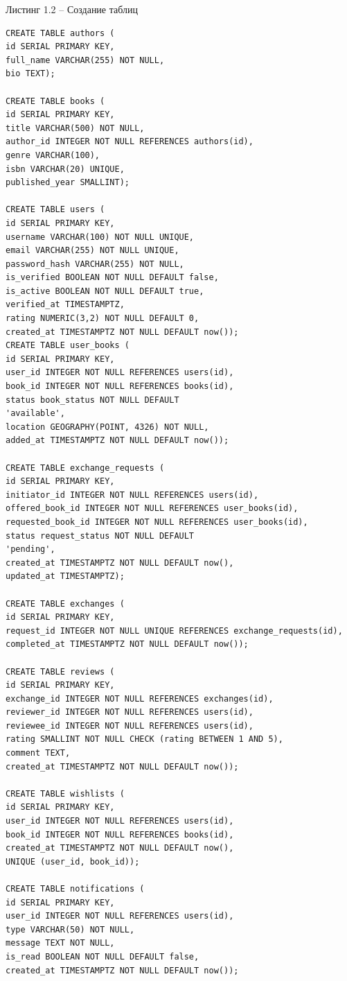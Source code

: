 \documentclass[14pt,a4paper]{extarticle}
\begin{document}
\begin{center}
Листинг 1.2 -- Создание таблиц
\end{center}
\begin{lstlisting}
CREATE TABLE authors (
id SERIAL PRIMARY KEY,
full_name VARCHAR(255) NOT NULL,
bio TEXT);

CREATE TABLE books (
id SERIAL PRIMARY KEY,
title VARCHAR(500) NOT NULL,
author_id INTEGER NOT NULL REFERENCES authors(id),
genre VARCHAR(100),
isbn VARCHAR(20) UNIQUE,
published_year SMALLINT);

CREATE TABLE users (
id SERIAL PRIMARY KEY,
username VARCHAR(100) NOT NULL UNIQUE,
email VARCHAR(255) NOT NULL UNIQUE,
password_hash VARCHAR(255) NOT NULL,
is_verified BOOLEAN NOT NULL DEFAULT false,
is_active BOOLEAN NOT NULL DEFAULT true,
verified_at TIMESTAMPTZ,
rating NUMERIC(3,2) NOT NULL DEFAULT 0,
created_at TIMESTAMPTZ NOT NULL DEFAULT now());
CREATE TABLE user_books (
id SERIAL PRIMARY KEY,
user_id INTEGER NOT NULL REFERENCES users(id),
book_id INTEGER NOT NULL REFERENCES books(id),
status book_status NOT NULL DEFAULT
'available',
location GEOGRAPHY(POINT, 4326) NOT NULL,
added_at TIMESTAMPTZ NOT NULL DEFAULT now());

CREATE TABLE exchange_requests (
id SERIAL PRIMARY KEY,
initiator_id INTEGER NOT NULL REFERENCES users(id),
offered_book_id INTEGER NOT NULL REFERENCES user_books(id),
requested_book_id INTEGER NOT NULL REFERENCES user_books(id),
status request_status NOT NULL DEFAULT
'pending',
created_at TIMESTAMPTZ NOT NULL DEFAULT now(),
updated_at TIMESTAMPTZ);

CREATE TABLE exchanges (
id SERIAL PRIMARY KEY,
request_id INTEGER NOT NULL UNIQUE REFERENCES exchange_requests(id),
completed_at TIMESTAMPTZ NOT NULL DEFAULT now());

CREATE TABLE reviews (
id SERIAL PRIMARY KEY,
exchange_id INTEGER NOT NULL REFERENCES exchanges(id),
reviewer_id INTEGER NOT NULL REFERENCES users(id),
reviewee_id INTEGER NOT NULL REFERENCES users(id),
rating SMALLINT NOT NULL CHECK (rating BETWEEN 1 AND 5),
comment TEXT,
created_at TIMESTAMPTZ NOT NULL DEFAULT now());

CREATE TABLE wishlists (
id SERIAL PRIMARY KEY,
user_id INTEGER NOT NULL REFERENCES users(id),
book_id INTEGER NOT NULL REFERENCES books(id),
created_at TIMESTAMPTZ NOT NULL DEFAULT now(),
UNIQUE (user_id, book_id));

CREATE TABLE notifications (
id SERIAL PRIMARY KEY,
user_id INTEGER NOT NULL REFERENCES users(id),
type VARCHAR(50) NOT NULL,
message TEXT NOT NULL,
is_read BOOLEAN NOT NULL DEFAULT false,
created_at TIMESTAMPTZ NOT NULL DEFAULT now());
\end{lstlisting}
\end{document}
